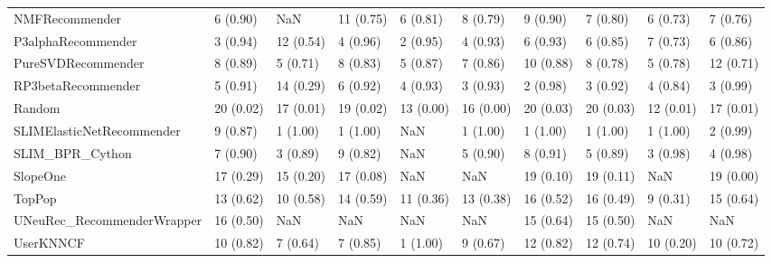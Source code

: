 \begin{tabular}{llllllllll}
                     NMFRecommender &                 6 (0.90) &         NaN &     11 (0.75) &     6 (0.81) &             8 (0.79) &            9 (0.90) &          7 (0.80) &           6 (0.73) &          7 (0.76) \\
                 P3alphaRecommender &                 3 (0.94) &   12 (0.54) &      4 (0.96) &     2 (0.95) &             4 (0.93) &            6 (0.93) &          6 (0.85) &           7 (0.73) &          6 (0.86) \\
                 PureSVDRecommender &                 8 (0.89) &    5 (0.71) &      8 (0.83) &     5 (0.87) &             7 (0.86) &           10 (0.88) &          8 (0.78) &           5 (0.78) &         12 (0.71) \\
                 RP3betaRecommender &                 5 (0.91) &   14 (0.29) &      6 (0.92) &     4 (0.93) &             3 (0.93) &            2 (0.98) &          3 (0.92) &           4 (0.84) &          3 (0.99) \\
                             Random &                20 (0.02) &   17 (0.01) &     19 (0.02) &    13 (0.00) &            16 (0.00) &           20 (0.03) &         20 (0.03) &          12 (0.01) &         17 (0.01) \\
          SLIMElasticNetRecommender &                 9 (0.87) &    1 (1.00) &      1 (1.00) &          NaN &             1 (1.00) &            1 (1.00) &          1 (1.00) &           1 (1.00) &          2 (0.99) \\
                    SLIM\_BPR\_Cython &                 7 (0.90) &    3 (0.89) &      9 (0.82) &          NaN &             5 (0.90) &            8 (0.91) &          5 (0.89) &           3 (0.98) &          4 (0.98) \\
                           SlopeOne &                17 (0.29) &   15 (0.20) &     17 (0.08) &          NaN &                  NaN &           19 (0.10) &         19 (0.11) &                NaN &         19 (0.00) \\
                             TopPop &                13 (0.62) &   10 (0.58) &     14 (0.59) &    11 (0.36) &            13 (0.38) &           16 (0.52) &         16 (0.49) &           9 (0.31) &         15 (0.64) \\
         UNeuRec\_RecommenderWrapper &                16 (0.50) &         NaN &           NaN &          NaN &                  NaN &           15 (0.64) &         15 (0.50) &                NaN &               NaN \\
                          UserKNNCF &                10 (0.82) &    7 (0.64) &      7 (0.85) &     1 (1.00) &             9 (0.67) &           12 (0.82) &         12 (0.74) &          10 (0.20) &         10 (0.72) \\
\bottomrule
\end{tabular}
